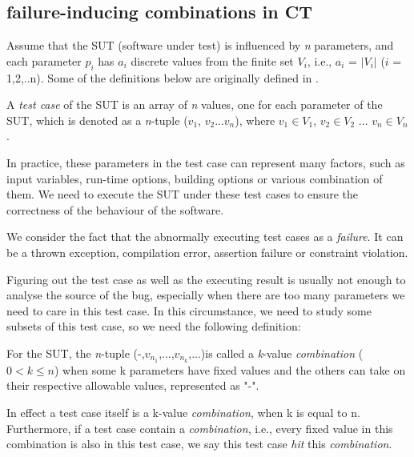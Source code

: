 \documentclass{sig-alternate}
\begin{document}
\subsection{failure-inducing combinations in CT}

Assume that the SUT (software under test) is influenced by \emph{n} parameters, and each parameter $p_{i}$ has $a_{i}$ discrete values from the finite set $V_{i}$, i.e., $a_{i}$ = $|V_{i}|$ ($i$ = 1,2,..n). Some of the definitions below are originally defined in \cite{nie2011survey}.

\begin{definition}
A \emph{test case} of the SUT is an array of \emph{n} values, one for each parameter of the SUT, which is denoted as a \emph{n}-tuple ($v_{1}$, $v_{2}$...$v_{n}$), where $v_{1}\in V_{1}$, $v_{2} \in V_{2}$ ... $v_{n} \in V_{n}$.
\end{definition}

In practice, these parameters in the test case can represent many factors, such as input variables, run-time options, building options or various combination of them. We need to execute the SUT under these test cases to ensure the correctness of the behaviour of the software.

We consider the fact that the abnormally executing test cases as a \emph{failure}. It can be a thrown exception, compilation error, assertion failure or constraint violation.

Figuring out the test case as well as the executing result is usually not enough to analyse the source of the bug, especially when there are too many parameters we need to care in this test case. In this circumstance, we need to study some subsets of this test case, so we need the following definition:

\begin{definition}
For the SUT, the \emph{n}-tuple (-,$v_{n_{1}}$,...,$v_{n_{k}}$,...)is called a \emph{k}-value \emph{combination} ($0 < k \leq n $) when some k parameters have fixed values and the others can take on their respective allowable values, represented as "-".

In effect a test case itself is a k-value \emph{combination}, when k is equal to n. Furthermore, if a test case contain a \emph{combination}, i.e., every fixed value in this combination is also in this test case, we say this test case \emph{hit} this \emph{combination}.
\end{definition}
\end{document}

